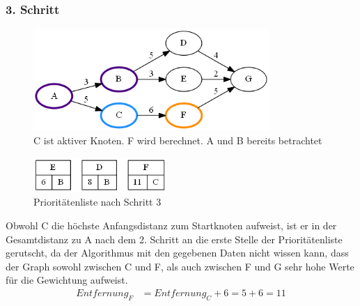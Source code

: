 \documentclass[11pt]{scrreprt}
\begin{document}
			\subsubsection{3. Schritt}
			\begin{figure}[ht]
				\centering
				\includegraphics[width=0.8\textwidth]{Graphs/Example3}
				\caption{C ist aktiver Knoten. F wird berechnet. A und B bereits betrachtet}
			\end{figure}
			\begin{figure}[ht]
				\centering
				\includegraphics[width=0.45\textwidth]{Graphs/Example3_PQ}
				\caption{Prioritätenliste nach Schritt 3}
			\end{figure}
			\FloatBarrier
			Obwohl C die höchste Anfangsdistanz zum Startknoten aufweist, ist er in der Gesamtdistanz zu A nach dem 2. Schritt an die erste Stelle der Prioritätenliste gerutscht, da der Algorithmus mit den gegebenen Daten nicht wissen kann, dass der Graph sowohl zwischen C und F, als auch zwischen F und G sehr hohe Werte für die Gewichtung aufweist.
			\begin{align*}
			Entfernung_F &= Entfernung_C + 6 = 5 + 6 = 11
			\end{align*}
			
			\newpage
\end{document}
